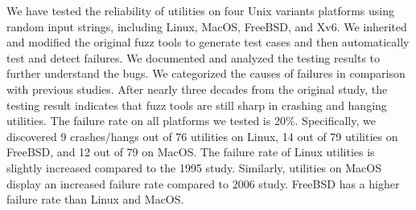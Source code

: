 We have tested the reliability of utilities on four Unix variants platforms using random input strings, including Linux, MacOS, FreeBSD, and Xv6. We inherited and modified the original fuzz tools to generate test cases and then automatically test and detect failures. We documented and analyzed the testing results to further understand the bugs. We categorized the causes of failures in comparison with previous studies. After nearly three decades from the original study, the testing result indicates that fuzz tools are still sharp in crashing and hanging utilities. The failure rate on all platforms we tested is 20\%. 
Specifically, we discovered 9 crashes/hangs out of 76 utilities on Linux, 14 out of 79 utilities on FreeBSD, and 12 out of 79 on MacOS. The failure rate of Linux utilities is slightly increased compared to the 1995 study. Similarly, utilities on MacOS display an increased failure rate compared to 2006 study. FreeBSD has a higher failure rate than Linux and MacOS. 